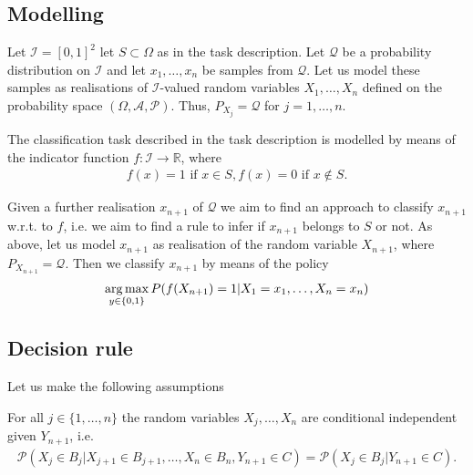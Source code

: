 \subsection{Modelling}

	Let $\mathcal{I}=[0, 1]^{2}$ let $S\subset\Omega$ as in the task description. Let $\mathcal{Q}$ be a probability distribution on 
	$\mathcal{I}$ and let $x_{1}, \ldots, x_{n}$ be samples from $\mathcal{Q}$. Let us model these samples as realisations of 
	$\mathcal{I}$-valued random variables $X_{1}, \ldots, X_{n}$ defined on the probability space 
	$(\Omega, \mathcal{A}, \mathcal{P})$. Thus, $P_{X_{j}} = \mathcal{Q}$ for $j = 1, \ldots, n$.
	
	The classification task described in the task description is modelled by means of the indicator function 
	$f:\mathcal{I}\rightarrow\mathbb{R}$, where
	\begin{align*}
		f(x) = 1 \text{ if } x\in S, f(x) = 0 \text{ if } x\notin S.
	\end{align*}
	
	Given a further realisation $x_{n + 1}$ of $\mathcal{Q}$ we aim to find an approach to classify $x_{n + 1}$ w.r.t. to 
	$f$, i.e. we aim to find a rule to infer if $x_{n + 1}$ belongs to $S$ or not. As above, let us model $x_{n + 1}$ as realisation 
	of the random variable $X_{n + 1}$, where $P_{X_{n + 1}} = \mathcal{Q}$. Then we classify $x_{n + 1}$ by means of the policy
	\begin{align}\label{eq:dec_rule}
		\operatorname*{arg\,max}_{y\in\{0, 1\}} P(f(X_{n + 1}) = 1 | X_{1} = x_{1}, \ldots, X_{n} = x_{n}) 
	\end{align}
	
	
\subsection{Decision rule}
	
  Let us make the following assumptions

  \begin{myAssmptn}\label{assmptn:cond_independence}
    For all $j\in\{1, \ldots, n\}$ the random variables $X_{j}, \ldots, X_{n}$ are conditional independent given 
  	$Y_{n + 1}$, i.e.
  	\begin{align*}
	  	\mathcal{P}(X_{j}\in B_{j} | X_{j + 1}\in B_{j + 1}, \ldots, X_{n}\in B_{n}, Y_{n + 1}\in C) = \mathcal{P}(X_{j}\in B_{j} | Y_{n + 1}\in C).
  	\end{align*}
	\end{myAssmptn}

